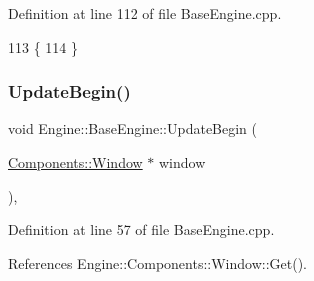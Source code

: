 Definition at line 112 of file Base\+Engine.\+cpp.


\begin{DoxyCode}
113 \{
114 \}
\end{DoxyCode}
\mbox{\label{classEngine_1_1BaseEngine_aace6be2a42d12b64fbd35f1acdb08408}} 
\subsubsection{\texorpdfstring{Update\+Begin()}{UpdateBegin()}}
{\footnotesize\ttfamily void Engine\+::\+Base\+Engine\+::\+Update\+Begin (\begin{DoxyParamCaption}\item[{\mbox{\hyperlink{classEngine_1_1Components_1_1Window}{Components\+::\+Window}} $\ast$}]{window }\end{DoxyParamCaption})\hspace{0.3cm}{\ttfamily [virtual]}, {\ttfamily [inherited]}}



Definition at line 57 of file Base\+Engine.\+cpp.



References Engine\+::\+Components\+::\+Window\+::\+Get().


